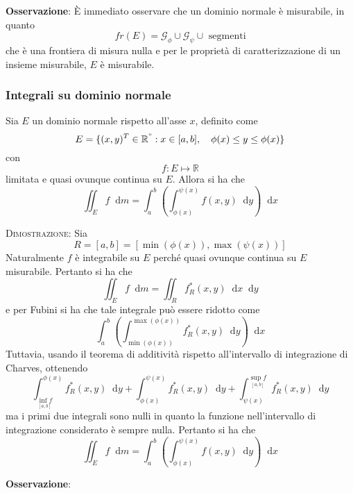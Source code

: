 \documentclass[a4paper]{extarticle}
\newcommand*\dif{\mathop{}\!\mathrm{d}}
\begin{document}
\vspace{1em}
\noindent
\textbf{Osservazione}: È immediato osservare che un dominio normale è misurabile, in quanto
\[fr(E) = \mathcal{G}_\phi \cup \mathcal{G}_\psi \cup \text{ segmenti}\]
che è una frontiera di misura nulla e per le proprietà di caratterizzazione di un insieme misurabile, $E$ è misurabile.

\vspace{1em}
\noindent
\subsubsection{Integrali su dominio normale}
Sia $E$ un dominio normale rispetto all'asse $x$, definito come
\[E = \{(x,y){^T} \in \mathbb{R}^" : x \in [a,b], \hspace{1em} \phi(x) \leq y \leq \phi(x)\}\]
con
\[f : E \longmapsto \mathbb{R}\]
limitata e quasi ovunque continua su $E$. Allora si ha che
\[\iint_E f \dif m = \int_a^b \left(\int_{\phi(x)}^{\psi(x)} f(x,y) \dif y\right) \dif x\]

\vspace{2em}
\noindent
\normalfont \normalsize
\textsc{Dimostrazione}: Sia
\[R = [a,b] = \left[\min(\phi(x)),\max(\psi(x)) \right]\]
Naturalmente $f$ è integrabile su $E$ perché quasi ovunque continua su $E$ misurabile. Pertanto si ha che 
\[\iint_E f \dif m = \iint_R f^*_R (x,y) \dif x \dif y\]
e per Fubini si ha che tale integrale può essere ridotto come
\[\int_a^b \left(\int_{\min(\phi(x))}^{\max(\phi(x))} f^*_R (x,y) \dif y\right) \dif x\]
Tuttavia, usando il teorema di additività rispetto all'intervallo di integrazione di Charves, ottenendo
\[\int_{\underset{[a,b]}{\inf f}}^{\phi(x)} f^*_R(x,y) \dif y + \int_{\phi(x)}^{\psi(x)} f^*_R (x,y) \dif y + \int_{\psi(x)}^{\underset{[a,b]}{\sup f}} f^*_R(x,y) \dif y\]
ma i primi due integrali sono nulli in quanto la funzione nell'intervallo di integrazione considerato è sempre nulla. Pertanto si ha che 
\[\iint_E f \dif m = \int_a^b \left(\int_{\phi(x)}^{\psi(x)} f(x,y) \dif y\right) \dif x\]

\vspace{1em}
\noindent
\textbf{Osservazione}: 
\end{document}
